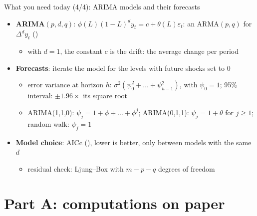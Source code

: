 \begin{frame}{What you need today (4/4): ARIMA models and their forecasts}
\itemsize{\small}
\begin{itemize}
    \item \textbf{ARIMA$(p,d,q)$}: $\phi(L)(1 - L)^d y_t = c + \theta(L)\varepsilon_t$: an ARMA$(p,q)$ for $\Delta^d y_t$ ()
    \begin{itemize}
        \item with $d = 1$, the constant $c$ is the drift: the average change per period
    \end{itemize}
    \item \textbf{Forecasts}: iterate the model for the levels with future shocks set to 0
    \begin{itemize}
        \item error variance at horizon $h$: $\sigma^2(\psi_0^2 + \dots + \psi_{h-1}^2)$, with $\psi_0 = 1$; 95\% interval: $\pm 1.96\times$ its square root
        \item ARIMA(1,1,0): $\psi_j = 1 + \phi + \dots + \phi^j$; ARIMA(0,1,1): $\psi_j = 1 + \theta$ for $j \ge 1$; random walk: $\psi_j = 1$
    \end{itemize}
    \item \textbf{Model choice}: AICc (), lower is better, only between models with the same $d$
    \begin{itemize}
        \item residual check: Ljung--Box with $m - p - q$ degrees of freedom
    \end{itemize}
\end{itemize}
\end{frame}


\section{Part A: computations on paper}

